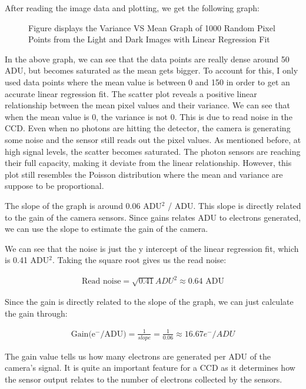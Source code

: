 \documentclass[10pt, preprint]{aastex}
\begin{document}
After reading the image data and plotting, we get the following graph:

\begin{figure}[H]
\caption{\label{Varvsmean} Figure displays the Variance VS Mean Graph of 1000 Random Pixel Points from the Light and Dark Images with Linear Regression Fit}
\end{figure}

In the above graph, we can see that the data points are really dense around 50 ADU, but becomes saturated as the mean gets bigger. To account for this, I only used data points where the mean value is between 0 and 150 in order to get an accurate linear regression fit. The scatter plot reveals a positive linear relationship between the mean pixel values and their variance. We can see that when the mean value is 0, the variance is not 0. This is due to read noise in the CCD. Even when no photons are hitting the detector, the camera is generating some noise and the sensor still reads out the pixel values. As mentioned before, at high signal levels, the scatter becomes saturated. The photon sensors are reaching their full capacity, making it deviate from the linear relationship. However, this plot still resembles the Poisson distribution where the mean and variance are suppose to be proportional.

The slope of the graph is around 0.06 ADU$^2$ / ADU. This slope is directly related to the gain of the camera sensors. Since gains relates ADU to electrons generated, we can use the slope to estimate the gain of the camera.

We can see that the noise is just the y intercept of the linear regression fit, which is 0.41 ADU$^2$. Taking the square root gives us the read noise:

\begin{align*}
    \text{Read noise} = \sqrt{0.41}ADU^2 \approx 0.64 \text{ ADU}
\end{align*}

Since the gain is directly related to the slope of the graph, we can just calculate the gain through:

\begin{align*}
    \text{Gain(e$^-$/ADU)} = \frac{1}{slope} = \frac{1}{0.06} \approx 16.67 e^- / ADU
\end{align*}

The gain value tells us how many electrons are generated per ADU of the camera's signal. It is quite an important feature for a CCD as it determines how the sensor output relates to the number of electrons collected by the sensors. 
\end{document}
